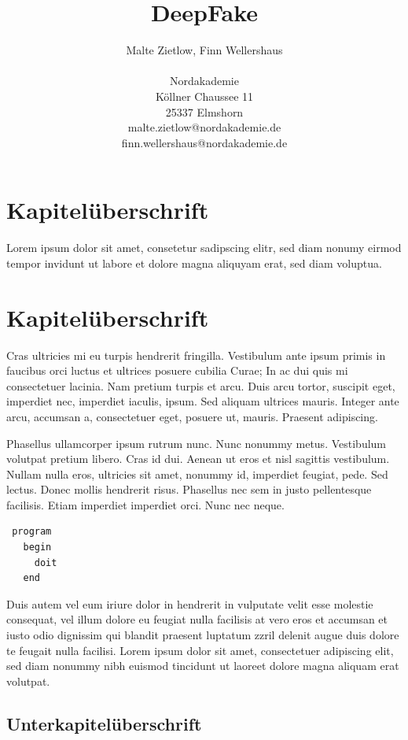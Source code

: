 \documentclass{akdai}
\author{
	Malte Zietlow, Finn Wellershaus \\ 
	\\
	Nordakademie\\ 
	Köllner Chaussee 11\\ 
	25337 Elmshorn \\ 
	malte.zietlow@nordakademie.de \\
	finn.wellershaus@nordakademie.de
}
\title{DeepFake}
\theoremstyle{definition}
\begin{document}
\maketitle



\section{Kapitelüberschrift}

Lorem ipsum dolor sit amet, consetetur sadipscing elitr, sed diam nonumy eirmod tempor invidunt
ut labore et dolore magna aliquyam erat, sed diam voluptua.

\blindtext[1]

\section{Kapitelüberschrift}

Cras ultricies mi eu turpis hendrerit fringilla. Vestibulum ante ipsum primis in faucibus orci 
luctus et ultrices posuere cubilia Curae; In ac dui quis mi consectetuer lacinia. Nam pretium 
turpis 
et arcu. Duis arcu tortor, suscipit eget, imperdiet nec, imperdiet iaculis, ipsum. Sed aliquam 
ultrices mauris. Integer ante arcu, accumsan a, consectetuer eget, posuere ut, mauris. Praesent 
adipiscing.

Phasellus ullamcorper ipsum rutrum nunc. Nunc nonummy metus. Vestibulum volutpat pretium libero. 
Cras id dui. Aenean ut eros et nisl sagittis vestibulum. Nullam nulla eros, ultricies sit amet, 
nonummy id, imperdiet feugiat, pede. Sed lectus. Donec mollis hendrerit risus. Phasellus nec sem in 
justo pellentesque facilisis. Etiam imperdiet imperdiet orci. Nunc nec neque.
 

\begin{verbatim}
 program
   begin
     doit
   end
\end{verbatim}

Duis autem vel eum iriure dolor in hendrerit in vulputate velit esse molestie consequat, vel illum 
dolore eu feugiat nulla facilisis at vero eros et accumsan et iusto odio dignissim qui blandit 
praesent luptatum zzril delenit augue duis dolore te feugait nulla facilisi. Lorem ipsum dolor sit 
amet, consectetuer adipiscing elit, sed diam nonummy nibh euismod tincidunt ut laoreet dolore magna 
aliquam erat volutpat. 


\subsection{Unterkapitelüberschrift}
\end{document}
